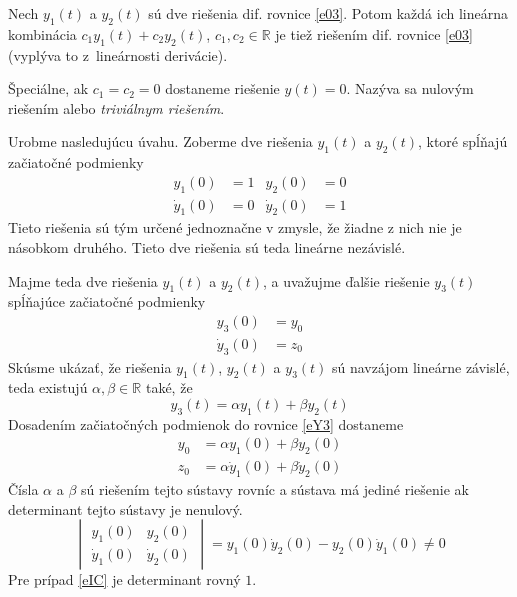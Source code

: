 \documentclass[a4paper, 10pt, ]{article}
\begin{document}
Nech $y_1(t)$ a $y_2(t)$ sú dve riešenia dif. rovnice \eqref{e03}. Potom každá ich lineárna kombinácia $c_1 y_1(t) + c_2 y_2(t) $, $c_1, c_2 \in \mathbb R$ je tiež riešením dif. rovnice \eqref{e03} (vyplýva to z~lineárnosti derivácie). 

Špeciálne, ak $c_1 = c_2 = 0$ dostaneme riešenie $y(t) = 0$. Nazýva sa nulovým riešením alebo \emph{triviálnym riešením}.

Urobme nasledujúcu úvahu. Zoberme dve riešenia $y_1(t)$ a $y_2(t)$, ktoré spĺňajú začiatočné podmienky
\begin{subequations} \label{eIC}
    \begin{align}
        y_1(0) &= 1      &        y_2(0) &= 0       \\
        \dot y_1(0) &= 0  &      \dot y_2(0) &= 1
    \end{align}
\end{subequations}
Tieto riešenia sú tým určené jednoznačne v zmysle, že žiadne z nich nie je násobkom druhého. Tieto dve riešenia sú teda lineárne nezávislé.

Majme teda dve riešenia $y_1(t)$ a $y_2(t)$, a uvažujme ďalšie riešenie $y_3(t)$ spĺňajúce začiatočné podmienky
\begin{subequations}
    \begin{align}
        y_3(0) &= y_0           \\
        \dot y_3(0) &= z_0  
    \end{align}
\end{subequations}
Skúsme ukázať, že riešenia $y_1(t)$,  $y_2(t)$ a $y_3(t)$ sú navzájom lineárne závislé, teda existujú $\alpha, \beta \in \mathbb R$ také, že
\begin{equation}
    y_3(t) = \alpha y_1(t) + \beta y_2(t) \label{eY3}
\end{equation}
Dosadením začiatočných podmienok do rovnice \eqref{eY3} dostaneme
\begin{subequations}
    \begin{align}
        y_0 &= \alpha y_1(0) + \beta y_2(0)    \\
        z_0 &= \alpha \dot y_1(0) + \beta \dot y_2(0) 
    \end{align}
\end{subequations}
Čísla $\alpha$ a $\beta$ sú riešením tejto sústavy rovníc a sústava má jediné riešenie ak determinant tejto sústavy je nenulový.
\begin{equation} \label{Wdet}
    \begin{vmatrix}
        y_1(0) & y_2(0) \\
        \dot y_1(0) & \dot y_2(0)
    \end{vmatrix} 
    =
    y_1(0) \dot y_2(0) -  y_2(0) \dot y_1(0)
    \neq 0
\end{equation}
Pre prípad \eqref{eIC} je determinant rovný $1$.
\end{document}
